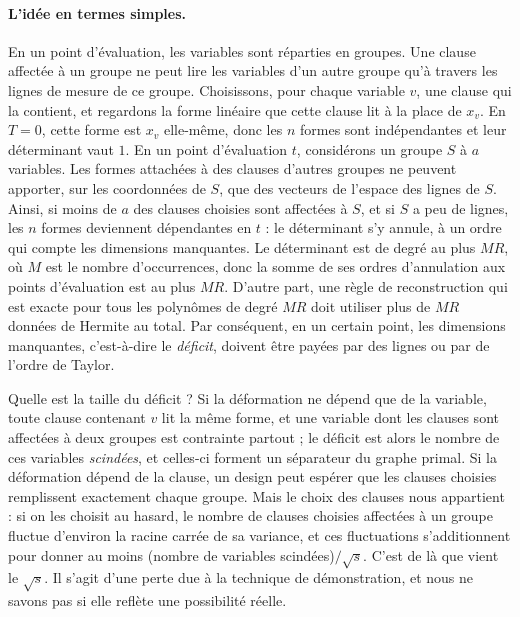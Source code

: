 \documentclass[11pt,a4paper]{article}
\theoremstyle{definition}
\theoremstyle{remark}
\begin{document}
\paragraph{L'idée en termes simples.}
En un point d'évaluation, les variables sont réparties en groupes. Une clause affectée à un
groupe ne peut lire les variables d'un autre groupe qu'à travers les lignes de mesure de ce
groupe. Choisissons, pour chaque variable $v$, une clause qui la contient, et regardons la
forme linéaire que cette clause lit à la place de $x_v$. En $T=0$, cette forme est $x_v$
elle-même, donc les $n$ formes sont indépendantes et leur déterminant vaut $1$. En un point
d'évaluation $t$, considérons un groupe $S$ à $a$ variables. Les formes attachées à des
clauses d'autres groupes ne peuvent apporter, sur les coordonnées de $S$, que des vecteurs de
l'espace des lignes de $S$. Ainsi, si moins de $a$ des clauses choisies sont affectées à
$S$, et si $S$ a peu de lignes, les $n$ formes deviennent dépendantes en $t$ : le
déterminant s'y annule, à un ordre qui compte les dimensions manquantes. Le déterminant est
de degré au plus $MR$, où $M$ est le nombre d'occurrences, donc la somme de ses ordres
d'annulation aux points d'évaluation est au plus $MR$. D'autre part, une règle de
reconstruction qui est exacte pour tous les polynômes de degré $MR$ doit utiliser plus de
$MR$ données de Hermite au total. Par conséquent, en un certain point, les dimensions
manquantes, c'est-à-dire le \emph{déficit}, doivent être payées par des lignes ou par de
l'ordre de Taylor.

Quelle est la taille du déficit ? Si la déformation ne dépend que de la variable, toute
clause contenant $v$ lit la même forme, et une variable dont les clauses sont affectées à
deux groupes est contrainte partout ; le déficit est alors le nombre de ces variables
\emph{scindées}, et celles-ci forment un séparateur du graphe primal. Si la déformation
dépend de la clause, un design peut espérer que les clauses choisies remplissent exactement
chaque groupe. Mais le choix des clauses nous appartient : si on les choisit au hasard, le
nombre de clauses choisies affectées à un groupe fluctue d'environ la racine carrée de sa
variance, et ces fluctuations s'additionnent pour donner au moins (nombre de variables
scindées)$/\sqrt{s}$. C'est de là que vient le $\sqrt s$. Il s'agit d'une perte due à la
technique de démonstration, et nous ne savons pas si elle reflète une possibilité réelle.
\end{document}
